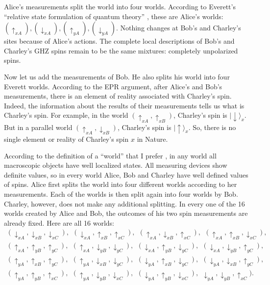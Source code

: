 \documentclass[11pt]{article}
\begin{document}
Alice's measurements split the world into four worlds. According to Everett's ``relative state formulation of quantum theory'' \cite{Eve}, these  are   Alice's worlds: $(\uparrow_{xA}),(\downarrow_{xA}),(\uparrow_{yA}),(\downarrow_{yA})$.   Nothing changes at Bob's and Charley's sites because of Alice's actions. The complete local descriptions of Bob's and Charley's GHZ spins remain to be  the same mixtures: completely unpolarized spins.

Now let us add the measurements of Bob. He also splits his world  into four Everett worlds. According to the EPR argument, after Alice's  and Bob's measurements, there is an element of reality associated with Charley's spin. Indeed, the information about the results of  their measurements tells us what is Charley's spin. For example, in the  world  $(\uparrow_{xA}, \uparrow_{xB})$,  Charley's spin is $|{\downarrow}\rangle_x$. But in a parallel world $(\uparrow_{xA}, \downarrow_{xB})$,  Charley's spin is $|{\uparrow}\rangle_x$. So, there is no single element or reality of Charley's spin $x$ in Nature.

 According to the definition of a ``world'' that I prefer \cite{SEP}, in any world all macroscopic objects  have well localized states.  All measuring devices show definite values, so in every world Alice, Bob and Charley have well defined values of spins. Alice first splits the world into four different worlds according to her measurements. Each of the worlds is then split again into four worlds by Bob. Charley, however, does not make any additional splitting. In every one of the 16 worlds created by Alice and Bob, the outcomes of his two spin measurements are already fixed. Here are all 16 worlds:
 \begin{eqnarray}
\nonumber
 (\downarrow_{xA}, \downarrow_{xB}, \downarrow_{xC}),~~(\downarrow_{xA}, \uparrow_{xB}, \uparrow_{xC}),~~(\uparrow_{xA}, \downarrow_{xB}, \uparrow_{xC}),~~(\uparrow_{xA}, \uparrow_{xB}, \downarrow_{xC}),~~ \\ \nonumber
 (\uparrow_{xA}, \uparrow_{yB}, \uparrow_{yC}),~~(\uparrow_{xA}, \downarrow_{yB}, \downarrow_{yC}),~~(\downarrow_{xA}, \uparrow_{yB}, \downarrow_{yC}),~~(\downarrow_{xA}, \downarrow_{yB}, \uparrow_{yC}),~~ \\
 (\uparrow_{yA}, \uparrow_{xB}, \uparrow_{yC}),~~(\uparrow_{yA}, \downarrow_{xB}, \downarrow_{yC}),~~(\downarrow_{yA}, \uparrow_{xB}, \downarrow_{yC}),~~(\downarrow_{yA}, \downarrow_{xB}, \uparrow_{yC}),~~ \\\nonumber
 (\uparrow_{yA}, \uparrow_{yB}, \uparrow_{xC}),~~(\uparrow_{yA}, \downarrow_{yB}, \downarrow_{xC}),~~(\downarrow_{yA}, \uparrow_{yB}, \downarrow_{xC}),~~\downarrow_{yA}, \downarrow_{yB}, \uparrow_{xC}).~~
  \end{eqnarray}
\end{document}
